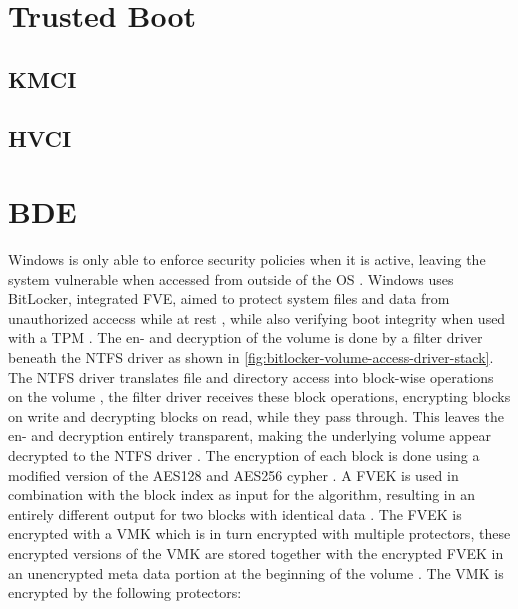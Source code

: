 \section{Trusted Boot}
\subsection{KMCI}
\subsection{HVCI}

\section{\acf{BDE}}
\label{sec:windows:bde}
Windows is only able to enforce security policies when it is active, leaving the system vulnerable when accessed from outside of the \ac{OS} \cite[9. BitLocker Drive encryption]{windows-internals-6-part2}.
Windows uses BitLocker, integrated \ac{FVE}, aimed to protect system files and data from unauthorized accecss while at rest \cite{microsoft-bitlocker-overview}, while also verifying boot integrity when used with a \ac{TPM} \cite[9. BitLocker Drive encryption]{windows-internals-6-part2}.
The en- and decryption of the volume is done by a filter driver beneath the \ac{NTFS} driver as shown in \autoref{fig:bitlocker-volume-access-driver-stack}.
The \ac{NTFS} driver translates file and directory access into block-wise operations on the volume , the filter driver receives these block operations, encrypting blocks on write and decrypting blocks on read, while they pass through.
This leaves the en- and decryption entirely transparent, making the underlying volume appear decrypted to the \ac{NTFS} driver \cite[9. Full-Volume Encryption Driver]{windows-internals-6-part2}.
The encryption of each block is done using a modified version of the \ac{AES}128 and \ac{AES}256 cypher \cite[9. Encryption Keys]{windows-internals-6-part2}.
A \ac{FVEK} is used in combination with the block index as input for the algorithm, resulting in an entirely different output for two blocks with identical data \cite[9. Full-Volume Encryption Driver]{windows-internals-6-part2}.
The \ac{FVEK} is encrypted with a \ac{VMK} which is in turn encrypted with multiple protectors, these encrypted versions of the \ac{VMK} are stored together with the encrypted \ac{FVEK} in an unencrypted meta data portion at the beginning of the volume \cite[9. Encryption Keys]{windows-internals-6-part2}.
The \ac{VMK} is encrypted by the following protectors:

